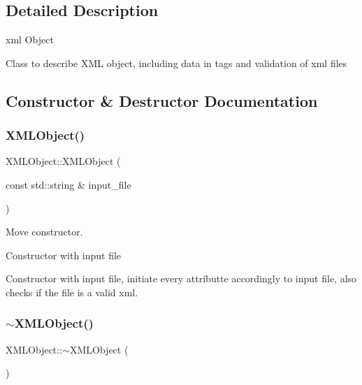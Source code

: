 \subsection{Detailed Description}
xml Object 

Class to describe X\+ML object, including data in tags and validation of xml files 

\subsection{Constructor \& Destructor Documentation}
\mbox{\label{class_x_m_l_object_a4bc5942fe99811ae8aadd1d59e372063}} 
\subsubsection{\texorpdfstring{X\+M\+L\+Object()}{XMLObject()}}
{\footnotesize\ttfamily X\+M\+L\+Object\+::\+X\+M\+L\+Object (\begin{DoxyParamCaption}\item[{const std\+::string \&}]{input\+\_\+file }\end{DoxyParamCaption})\hspace{0.3cm}{\ttfamily [explicit]}}



Move constructor. 

Constructor with input file

Constructor with input file, initiate every attributte accordingly to input file, also checks if the file is a valid xml. \mbox{\label{class_x_m_l_object_a2dd56725772090aff6c954651d3ddebb}} 
\subsubsection{\texorpdfstring{$\sim$\+X\+M\+L\+Object()}{~XMLObject()}}
{\footnotesize\ttfamily X\+M\+L\+Object\+::$\sim$\+X\+M\+L\+Object (\begin{DoxyParamCaption}{ }\end{DoxyParamCaption})}



